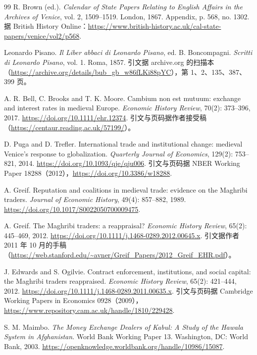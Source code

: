 \begin{thebibliography}{99}
 R. Brown (ed.). \emph{Calendar of State Papers Relating to English Affairs in the Archives of Venice}, vol. 2, 1509--1519. London, 1867. Appendix, p. 568, no. 1302. 据 British History Online：\url{https://www.british-history.ac.uk/cal-state-papers/venice/vol2/p568}.

 Leonardo Pisano. \emph{Il Liber abbaci di Leonardo Pisano}, ed. B. Boncompagni. \emph{Scritti di Leonardo Pisano}, vol. 1. Roma, 1857. 引文据 archive.org 的扫描本（\url{https://archive.org/details/bub_gb_w86fLKi88pYC}），第 1、2、135、387、399 页。

 A. R. Bell, C. Brooks and T. K. Moore. Cambium non est mutuum: exchange and interest rates in medieval Europe. \emph{Economic History Review}, 70(2): 373--396, 2017. \url{https://doi.org/10.1111/ehr.12374}. 引文与页码据作者接受稿（\url{https://centaur.reading.ac.uk/57199/}）。

 D. Puga and D. Trefler. International trade and institutional change: medieval Venice's response to globalization. \emph{Quarterly Journal of Economics}, 129(2): 753--821, 2014. \url{https://doi.org/10.1093/qje/qju006}. 引文与页码据 NBER Working Paper 18288（2012），\url{https://doi.org/10.3386/w18288}.

 A. Greif. Reputation and coalitions in medieval trade: evidence on the Maghribi traders. \emph{Journal of Economic History}, 49(4): 857--882, 1989. \url{https://doi.org/10.1017/S0022050700009475}.

 A. Greif. The Maghribi traders: a reappraisal? \emph{Economic History Review}, 65(2): 445--469, 2012. \url{https://doi.org/10.1111/j.1468-0289.2012.00645.x}. 引文据作者 2011 年 10 月的手稿（\url{https://web.stanford.edu/~avner/Greif_Papers/2012_Greif_EHR.pdf}）。

 J. Edwards and S. Ogilvie. Contract enforcement, institutions, and social capital: the Maghribi traders reappraised. \emph{Economic History Review}, 65(2): 421--444, 2012. \url{https://doi.org/10.1111/j.1468-0289.2011.00635.x}. 引文与页码据 Cambridge Working Papers in Economics 0928（2009），\url{https://www.repository.cam.ac.uk/handle/1810/229428}.

 S. M. Maimbo. \emph{The Money Exchange Dealers of Kabul: A Study of the Hawala System in Afghanistan}. World Bank Working Paper 13. Washington, DC: World Bank, 2003. \url{https://openknowledge.worldbank.org/handle/10986/15087}.


\end{thebibliography}
